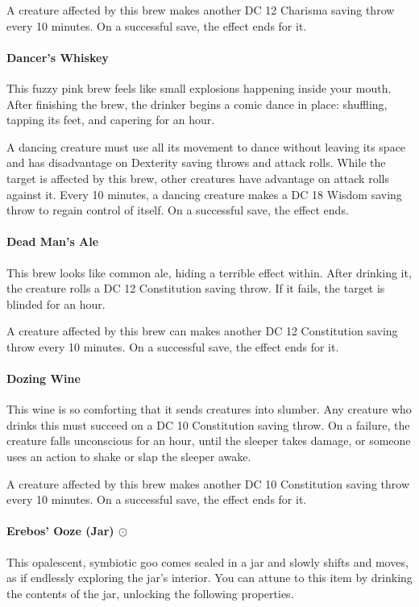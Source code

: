         A creature affected by this brew makes another DC 12 Charisma saving throw every 10 minutes.
        On a successful save, the effect ends for it.
    \paragraph{Dancer's Whiskey} %
        This fuzzy pink brew feels like small explosions happening inside your mouth.
        After finishing the brew, the drinker begins a comic dance in place: shuffling, tapping its feet, and capering for an hour.

        A dancing creature must use all its movement to dance without leaving its space and has disadvantage on Dexterity saving throws and attack rolls.
        While the target is affected by this brew, other creatures have advantage on attack rolls against it.
        Every 10 minutes, a dancing creature makes a DC 18 Wisdom saving throw to regain control of itself.
        On a successful save, the effect ends.
    \paragraph{Dead Man's Ale} %
        This brew looks like common ale, hiding a terrible effect within.
        After drinking it, the creature rolls a DC 12 Constitution saving throw.
        If it fails, the target is blinded for an hour.

        A creature affected by this brew can makes another DC 12 Constitution saving throw every 10 minutes.
        On a successful save, the effect ends for it.
    \paragraph{Dozing Wine} %
        This wine is so comforting that it sends creatures into slumber.
        Any creature who drinks this must succeed on a DC 10 Constitution saving throw.
        On a failure, the creature falls unconscious for an hour, until the sleeper takes damage, or someone uses an action to shake or slap the sleeper awake.

        A creature affected by this brew makes another DC 10 Constitution saving throw every 10 minutes.
        On a successful save, the effect ends for it.
    \paragraph{Erebos' Ooze (Jar) $\odot$} \label{item::erebosooze} %
        This opalescent, symbiotic goo comes sealed in a jar and slowly shifts and moves, as if endlessly exploring the jar's interior.
        You can attune to this item by drinking the contents of the jar, unlocking the following properties.

